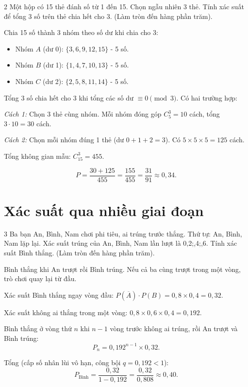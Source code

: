 \separator

\begin{baitoan}{2 \hfill {}}
Một hộp có 15 thẻ đánh số từ 1 đến 15. Chọn ngẫu nhiên 3 thẻ. Tính xác suất để tổng 3 số trên thẻ chia hết cho 3. (Làm tròn đến hàng phần trăm).
\end{baitoan}

\begin{loigiai}
Chia 15 số thành 3 nhóm theo số dư khi chia cho 3:
\begin{itemize}
  \item Nhóm $A$ (dư 0): $\{3, 6, 9, 12, 15\}$ - 5 số.
  \item Nhóm $B$ (dư 1): $\{1, 4, 7, 10, 13\}$ - 5 số.
  \item Nhóm $C$ (dư 2): $\{2, 5, 8, 11, 14\}$ - 5 số.
\end{itemize}

Tổng 3 số chia hết cho 3 khi tổng các số dư $\equiv 0\!\pmod{3}$. Có hai trường hợp:

\textit{Cách 1:} Chọn 3 thẻ cùng nhóm. Mỗi nhóm đóng góp $C_5^3 = 10$ cách, tổng $3 \cdot 10 = 30$ cách.

\textit{Cách 2:} Chọn mỗi nhóm đúng 1 thẻ (dư $0+1+2=3$). Có $5 \times 5 \times 5 = 125$ cách.

Tổng không gian mẫu: $C_{15}^3 = 455$.

\[ P = \frac{30 + 125}{455} = \frac{155}{455} = \frac{31}{91} \approx \boxed{0{,}34}. \]
\end{loigiai}

\separator

\section{Xác suất qua nhiều giai đoạn}

\begin{baitoan}{3 \hfill {}}
Ba bạn An, Bình, Nam chơi phi tiêu, ai trúng trước thắng. Thứ tự: An, Bình, Nam lặp lại. Xác suất trúng của An, Bình, Nam lần lượt là 0,2;,4;,6. Tính xác suất Bình thắng. (Làm tròn đến hàng phần trăm).
\end{baitoan}

\begin{loigiai}
Bình thắng khi An trượt rồi Bình trúng. Nếu cả ba cùng trượt trong một vòng, trò chơi quay lại từ đầu.

Xác suất Bình thắng ngay vòng đầu: $P(\overline{A}) \cdot P(B) = 0{,}8 \times 0{,}4 = 0{,}32$.

Xác suất không ai thắng trong một vòng: $0{,}8 \times 0{,}6 \times 0{,}4 = 0{,}192$.

Bình thắng ở vòng thứ $n$ khi $n-1$ vòng trước không ai trúng, rồi An trượt và Bình trúng:
\[ P_n = 0{,}192^{n-1} \times 0{,}32. \]

Tổng (cấp số nhân lùi vô hạn, công bội $q = 0{,}192 < 1$):
\[ P_{\text{Bình}} = \frac{0{,}32}{1 - 0{,}192} = \frac{0{,}32}{0{,}808} \approx \boxed{0{,}40}. \]
\end{loigiai}

